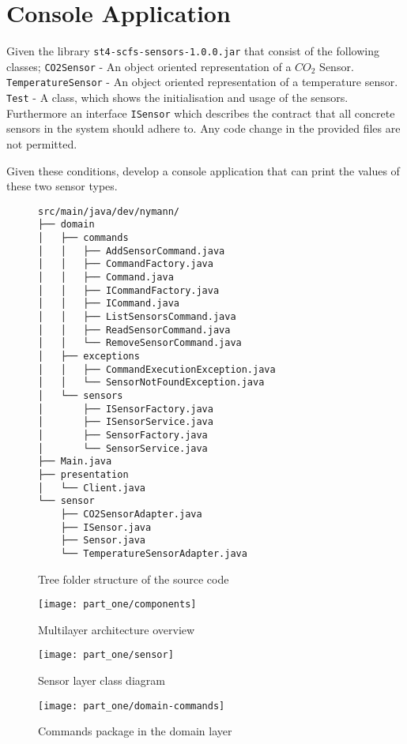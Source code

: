 \section{Console Application}
Given the library \texttt{st4-scfs-sensors-1.0.0.jar} that consist of the following classes;
\texttt{CO2Sensor} - An object oriented representation of a $CO_{2}$ Sensor.
\texttt{TemperatureSensor} - An object oriented representation of a temperature
sensor.
\texttt{Test} - A class, which shows the initialisation and usage of the sensors.
Furthermore an interface \texttt{ISensor} which describes the contract that all
concrete sensors in the system should adhere to.
Any code change in the provided files are not permitted.

Given these conditions, develop a console application that can print the values
of these two sensor types.
\begin{figure}
\caption{Tree folder structure of the source code} \centering
\footnotesize
\begin{verbatim}
src/main/java/dev/nymann/
├── domain
│   ├── commands
│   │   ├── AddSensorCommand.java
│   │   ├── CommandFactory.java
│   │   ├── Command.java
│   │   ├── ICommandFactory.java
│   │   ├── ICommand.java
│   │   ├── ListSensorsCommand.java
│   │   ├── ReadSensorCommand.java
│   │   └── RemoveSensorCommand.java
│   ├── exceptions
│   │   ├── CommandExecutionException.java
│   │   └── SensorNotFoundException.java
│   └── sensors
│       ├── ISensorFactory.java
│       ├── ISensorService.java
│       ├── SensorFactory.java
│       └── SensorService.java
├── Main.java
├── presentation
│   └── Client.java
└── sensor
    ├── CO2SensorAdapter.java
    ├── ISensor.java
    ├── Sensor.java
    └── TemperatureSensorAdapter.java
\end{verbatim}
\normalsize
\end{figure}

\begin{figure}
\caption{Multilayer architecture overview}
\centering
\texttt{[image: part\_one/components]}
\end{figure}

\begin{figure}
\caption{Sensor layer class diagram}
\centering
\texttt{[image: part\_one/sensor]}
\end{figure}

\begin{figure}
\caption{Commands package in the domain layer}
\centering
\texttt{[image: part\_one/domain-commands]}
\end{figure}


